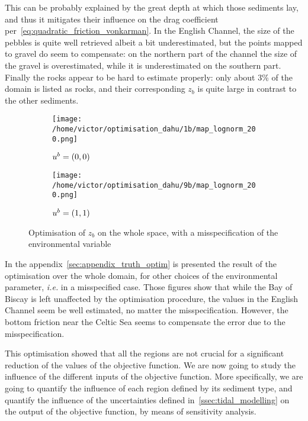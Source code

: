 \documentclass[../../Main_ManuscritThese.tex]{subfiles}
\newcommand{\zob}{z_b}
\begin{document}
This can be probably explained by the great depth at which those
sediments lay, and thus it mitigates their influence on the drag
coefficient per~\cref{eq:quadratic_friction_vonkarman}. In the English
Channel, the size of the pebbles is quite well retrieved albeit a bit
underestimated, but the points mapped to gravel do seem to compensate:
on the northern part of the channel the size of the gravel is
overestimated, while it is underestimated on the southern part.
Finally the rocks appear to be hard to estimate properly: only about
3\% of the domain is listed as rocks, and their corresponding $\zob$
is quite large in contrast to the other sediments.


\begin{figure}[ht]
  \centering
  \begin{subfigure}{\textwidth}
    \centering
  \texttt{[image: /home/victor/optimisation\_dahu/1b/map\_lognorm\_200.png]}
  \caption[Optimisation of $\zob$ on the whole space,
  $\uu^b = (0, 0)$]{\label{fig:optimization_1b} $\uu^b=(0, 0)$}
\end{subfigure}
\begin{subfigure}{\textwidth}
  \centering
  \texttt{[image: /home/victor/optimisation\_dahu/9b/map\_lognorm\_200.png]}
  \caption[Optimisation of $\zob$ on the whole
  space, $\uu^b = (1, 1)$]{\label{fig:optimization_9b} $\uu^b=(1, 1)$}
\end{subfigure}
\caption[Optimisation of $\zob$, misspecified case]{Optimisation of $\zob$ on the whole space, with a
  misspecification of the environmental variable}
\end{figure}

In the appendix~\cref{sec:appendix_truth_optim} is presented the
result of the optimisation over the whole domain, for other choices of
the environmental parameter, \emph{i.e.} in a misspecified case.
Those figures show that while the Bay of Biscay is left unaffected by
the optimisation procedure, the values in the English Channel seem be
well estimated, no matter the misspecification. However, the bottom
friction near the Celtic Sea seems to compensate the error due to the
misspecification.




This optimisation showed that all the regions are not crucial for a
significant reduction of the values of the objective function.
We are now going to study the influence of the different inputs of the
objective function. More specifically, we are going to quantify the
influence of each region defined by its sediment type, and quantify
the influence of the uncertainties defined
in~\cref{ssec:tidal_modelling} on the output of the objective
function, by means of sensitivity analysis.
\end{document}
